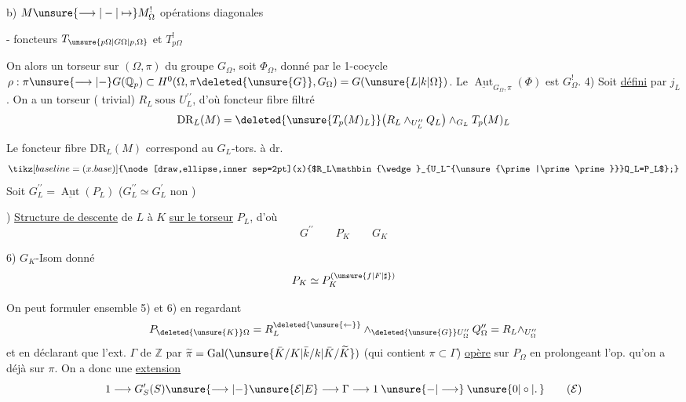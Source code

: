 b) $M\unsure{\longrightarrow|\mathbin{-}|\mapsto}M_\Omega^{!}$ opérations diagonales

- foncteurs $T_{\unsure{p\Omega|G\Omega|p,\Omega}}$ et $T_{p\Omega}^{!}$

 On  alors un \deleted{\unsure{$(\Omega,\pi)$-}}torseur  sur $(\Omega,\pi)$ du groupe $G_\Omega$, soit $\Phi_\Omega$, donné par le 1-cocycle $\rho:\pi\unsure{\longrightarrow|\mathbin{-}}G(\mathbb Q_p)\subset H^0(\Omega,\pi\deleted{\unsure{G}},G_\Omega)=G(\unsure{L|k|\Omega})$. Le \inserted{$(\Omega,\pi)$-} $\underline{\operatorname{Aut}}_{G_\Omega,\pi}(\Phi)$ est $G_\Omega^{!}$.
4) Soit  \uline{défini} par $j_L$. On a un torseur   ( trivial) \(\boxed{R_L\ \text{sous } U_L^{\prime\prime}}\), d’où  foncteur fibre filtré
\[
\mathrm{DR}_L(M)=\deleted{\unsure{T_p(M)_L}}\bigl(R_L\mathbin{\wedge}_{U_L^{\prime\prime}}Q_L\bigr)\mathbin{\wedge}_{G_L}T_p(M)_L
\]

 Le foncteur fibre $\mathrm{DR}_L(M)$ correspond au $G_L$-tors. à dr.
\[
\tikz[baseline=(x.base)]{\node[draw,ellipse,inner sep=2pt](x){$R_L\mathbin{\wedge}_{U_L^{\unsure{\prime|\prime\prime}}}Q_L=P_L$};}
\]
Soit $G_L^{\prime\prime}=\underline{\operatorname{Aut}}(P_L)$ \qquad ($G_L^{\prime\prime}\simeq G_L^{\prime}$ non )

\reversemarginpar{}) \uline{Structure de descente} de $L$ à $K$ \uline{sur le torseur} $P_L$, d’où
\[
G^{\prime\prime}\qquad P_K\qquad G_K
\]

6) $G_K$-Isom donné
\[
P_K\simeq P_K^{(\unsure{f|F|\sharp})}
\]

On peut formuler ensemble 5) et 6) en regardant
\[
P_{\deleted{\unsure{K}}\Omega}=R_L^{\deleted{\unsure{\leftarrow}}}\mathbin{\wedge}_{\deleted{\unsure{G}}U_\Omega^{\prime\prime}}Q_{\Omega}^{\prime\prime}=R_L\mathbin{\wedge}_{U_\Omega^{\prime\prime}}
\]
et en déclarant que l’ext. $\Gamma$ de $\mathbb Z$ par $\widetilde\pi=\operatorname{Gal}(\unsure{\bar K/K|\bar k/k|\bar K/\widetilde K})$ (qui contient $\pi\subset\Gamma$) \uline{opère} sur $P_\Omega$ en prolongeant l’op. qu’on a déjà sur $\pi$.
On a donc une \uline{extension}
\[
1\longrightarrow G'_S(S)\unsure{\longrightarrow|\mathbin{-}}\unsure{\mathcal E|E}\longrightarrow\Gamma\longrightarrow1\mathbin{\unsure{-|\longrightarrow}}\unsure{0|\circ|\ldotp}
\tag*{($\mathcal E$)}
\]

